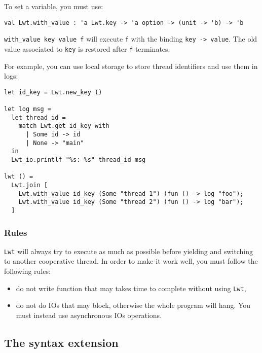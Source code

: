 \noindent
To set a variable, you must use:



\lstset{language=[Objective]Caml}\begin{lstlisting}
val Lwt.with_value : 'a Lwt.key -> 'a option -> (unit -> 'b) -> 'b
\end{lstlisting}
\medskip

\noindent
{\tt with\_value key value f} will execute {\tt f} with
the binding {\tt key -> value}. The old value associated to
{\tt key} is restored after {\tt f} terminates.



For example, you can use local storage to store thread identifiers
and use them in logs:



\lstset{language=[Objective]Caml}\begin{lstlisting}
let id_key = Lwt.new_key ()

let log msg =
  let thread_id =
    match Lwt.get id_key with
      | Some id -> id
      | None -> "main"
  in
  Lwt_io.printlf "%s: %s" thread_id msg

lwt () =
  Lwt.join [
    Lwt.with_value id_key (Some "thread 1") (fun () -> log "foo");
    Lwt.with_value id_key (Some "thread 2") (fun () -> log "bar");
  ]
\end{lstlisting}
\medskip

\noindent
\subsubsection{ Rules }

{\tt Lwt} will always try to execute as much as possible before yielding and
switching to another cooperative thread. In order to make it work well,
you must follow the following rules:



\begin{itemize}
\item  do not write function that may takes time to complete without
using {\tt Lwt},
\item  do not do IOs that may block, otherwise the whole program will
hang. You must instead use asynchronous IOs operations.

\end{itemize}

\subsection{ The syntax extension }

